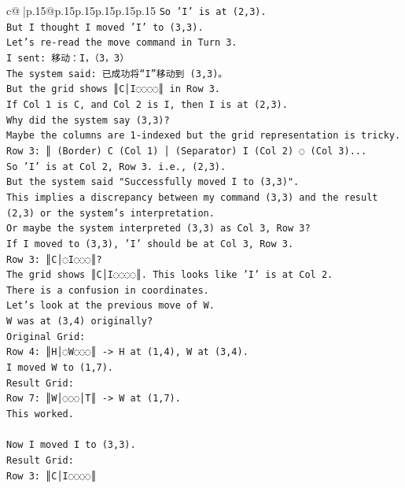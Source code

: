 \documentclass{article}
\begin{document}
{\begin{supertabular}{c@{$\;$}|p{.15\linewidth}@{}p{.15\linewidth}p{.15\linewidth}p{.15\linewidth}p{.15\linewidth}p{.15\linewidth}}
{{{\texttt{So 'I' is at (2,3).} \\
\texttt{But I thought I moved 'I' to (3,3).} \\
\texttt{Let's re{-}read the move command in Turn 3.} \\
\texttt{I sent: 移动：I，（3，3）} \\
\texttt{The system said: 已成功将“I”移动到 (3,3)。} \\
\texttt{But the grid shows ║C│I◌◌◌◌║ in Row 3.} \\
\texttt{If Col 1 is C, and Col 2 is I, then I is at (2,3).} \\
\texttt{Why did the system say (3,3)?} \\
\texttt{Maybe the columns are 1{-}indexed but the grid representation is tricky.} \\
\texttt{Row 3: ║ (Border) C (Col 1) │ (Separator) I (Col 2) ◌ (Col 3)...} \\
\texttt{So 'I' is at Col 2, Row 3. i.e., (2,3).} \\
\texttt{But the system said "Successfully moved I to (3,3)".} \\
\texttt{This implies a discrepancy between my command (3,3) and the result (2,3) or the system's interpretation.} \\
\texttt{Or maybe the system interpreted (3,3) as Col 3, Row 3?} \\
\texttt{If I moved to (3,3), 'I' should be at Col 3, Row 3.} \\
\texttt{Row 3: ║C│◌I◌◌◌║?} \\
\texttt{The grid shows ║C│I◌◌◌◌║. This looks like 'I' is at Col 2.} \\
\texttt{There is a confusion in coordinates.} \\
\texttt{Let's look at the previous move of W.} \\
\texttt{W was at (3,4) originally?} \\
\texttt{Original Grid:} \\
\texttt{Row 4: ║H│◌W◌◌◌║ {-}> H at (1,4), W at (3,4).} \\
\texttt{I moved W to (1,7).} \\
\texttt{Result Grid:} \\
\texttt{Row 7: ║W│◌◌◌│T║ {-}> W at (1,7).} \\
\texttt{This worked.} \\
\\ 
\texttt{Now I moved I to (3,3).} \\
\texttt{Result Grid:} \\
\texttt{Row 3: ║C│I◌◌◌◌║} \\
}}}
\end{supertabular}}
\end{document}
